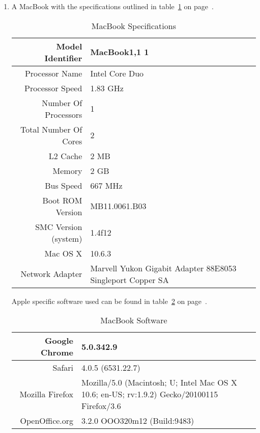 \begin{enumerate}

\item A MacBook with the specifications outlined in table~\ref{macbookSpecs} on page~\pageref{macbookSpecs}.

  \begin{table}[tbp]
    \begin{tabular}{| r | p{5cm} |}
      \hline
      Model Identifier      & MacBook1,1 1 \\ \hline
      Processor Name        & Intel Core Duo \\ \hline
      Processor Speed       & 1.83 GHz \\ \hline
      Number Of Processors  & 1 \\ \hline
      Total Number Of Cores & 2 \\ \hline
      L2 Cache              & 2 MB \\ \hline
      Memory                & 2 GB \\ \hline
      Bus Speed             & 667 MHz \\ \hline
      Boot ROM Version      & MB11.0061.B03 \\ \hline
      SMC Version (system)  & 1.4f12 \\ \hline
      Mac OS X              & 10.6.3 \\ \hline
      Network  Adapter      & Marvell Yukon Gigabit Adapter 88E8053 Singleport
      Copper SA \\
      \hline
    \end{tabular}
    \caption{MacBook Specifications}
    \label{macbookSpecs}
  \end{table}

  Apple specific software used can be found in table~\ref{macbookSoftware} on page~\pageref{macbookSoftware}.

  \begin{table}
    \begin{tabular}{| r | p{5cm} |}
      \hline
      Google Chrome       & 5.0.342.9 \\ \hline
      Safari              & 4.0.5 (6531.22.7) \\ \hline
      Mozilla Firefox     & Mozilla/5.0 (Macintosh; U; Intel Mac OS X 10.6; en-US;
                            rv:1.9.2) Gecko/20100115 Firefox/3.6 \\ \hline
      OpenOffice.org      & 3.2.0 OOO320m12 (Build:9483) \\
      \hline
    \end{tabular}
    \caption{MacBook Software}
    \label{macbookSoftware}
  \end{table}


\end{enumerate}
